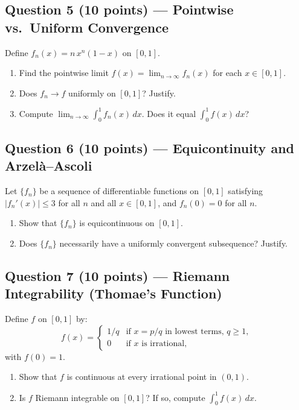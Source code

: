 \documentclass[10pt]{article}
\begin{document}
\subsection{Question 5 \textnormal{(10 points)} --- Pointwise vs.\ Uniform Convergence}

Define $f_n(x) = n\,x^n(1-x)$ on $[0,1]$.

\begin{enumerate}[label=(\alph*)]
  \item Find the pointwise limit $f(x) = \lim_{n \to \infty} f_n(x)$ for each $x \in [0,1]$.
  \item Does $f_n \to f$ uniformly on $[0,1]$? Justify.
  \item Compute $\displaystyle\lim_{n \to \infty} \int_0^1 f_n(x)\,dx$. Does it equal $\displaystyle\int_0^1 f(x)\,dx$?
\end{enumerate}

\subsection{Question 6 \textnormal{(10 points)} --- Equicontinuity and Arzel\`a--Ascoli}

Let $\{f_n\}$ be a sequence of differentiable functions on $[0,1]$ satisfying $|f_n'(x)| \leq 3$ for all $n$ and all $x \in [0,1]$, and $f_n(0) = 0$ for all $n$.

\begin{enumerate}[label=(\alph*)]
  \item Show that $\{f_n\}$ is equicontinuous on $[0,1]$.
  \item Does $\{f_n\}$ necessarily have a uniformly convergent subsequence? Justify.
\end{enumerate}

\subsection{Question 7 \textnormal{(10 points)} --- Riemann Integrability (Thomae's Function)}

Define $f$ on $[0,1]$ by:
$$
f(x) = \begin{cases}
1/q & \text{if } x = p/q \text{ in lowest terms, } q \geq 1, \\
0 & \text{if } x \text{ is irrational,}
\end{cases}
$$
with $f(0) = 1$.

\begin{enumerate}[label=(\alph*)]
  \item Show that $f$ is continuous at every irrational point in $(0,1)$.
  \item Is $f$ Riemann integrable on $[0,1]$? If so, compute $\displaystyle\int_0^1 f(x)\,dx$.
\end{enumerate}
\end{document}
